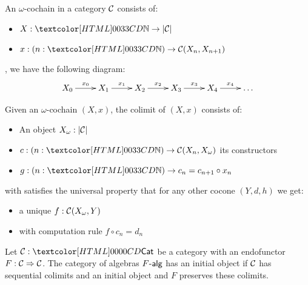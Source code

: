 \begin{definition}
  An $\omega$-cochain in a category $\mathcal{C}$ consists of:
  \begin{itemize}
  \item $X : \natty \to | \Cc |$
  \item $x : (n : \natty) \to \Cc(X_n , X_{n+1})$
  \end{itemize}
  \ie, we have the following diagram:
  $$
  \xymatrix{
    X_0 \ar[r]^{x_0}
    &X_1 \ar[r]^{x_1}
    &X_2 \ar[r]^{x_2}
    &X_3 \ar[r]^{x_3}
    &X_4 \ar[r]^{x_4}
    &\hdots
  }
  $$
\end{definition}

\begin{definition}
  Given an $\omega$-cochain $(X,x)$, the colimit of $(X,x)$ consists
  of:
  \begin{itemize}
  \item An object $X_\omega : | \mathcal{C} |$
  \item $c : (n : \natty) \to \Cc(X_n,X_\omega)$ its constructors
  \item $g : (n : \natty) \to c_n = c_{n+1} \circ x_n$
  \end{itemize}
  with satisfies the universal property that for any other cocone $(Y,d,h)$ we get:
  \begin{itemize}
  \item a unique $f : \mathcal{C}(X_\omega, Y)$
  \item with computation rule $f \circ c_n = d_n$
  \end{itemize}
\end{definition}

\begin{theorem}[Ad\'amek]
  \label{adamek-thm}
  Let $\Cc : \Cat$ be a category with an endofunctor
  $F : \mathcal{C} \Rightarrow \mathcal{C}$. The category of algebras $\algcat{F}$ has an
  initial object if $\mathcal{C}$ has sequential colimits and an initial
  object and $F$ preserves these colimits.
\end{theorem}

